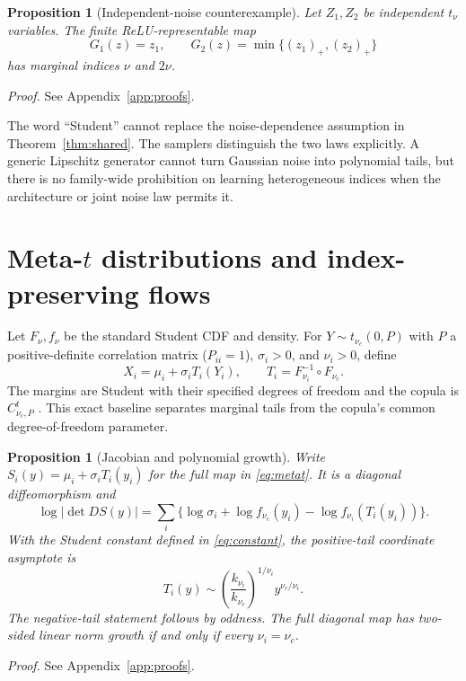 \documentclass[11pt]{article}
\newtheorem{proposition}[theorem]{Proposition}
\theoremstyle{definition}\newtheorem{definition}[theorem]{Definition}
\theoremstyle{remark}\newtheorem{remark}[theorem]{Remark}
\begin{document}
\begin{proposition}[Independent-noise counterexample]\label{prop:independent}
Let $Z_1,Z_2$ be independent $t_\nu$ variables. The finite ReLU-representable map
\begin{equation}
G_1(z)=z_1,\qquad G_2(z)=\min\{(z_1)_+,(z_2)_+\}
\end{equation}
has marginal indices $\nu$ and $2\nu$.
\end{proposition}
\noindent\emph{Proof.} See Appendix~\ref{app:proofs}.\par

The word ``Student'' cannot replace the noise-dependence assumption in Theorem~\ref{thm:shared}. The samplers distinguish the two laws explicitly. A generic Lipschitz generator cannot turn Gaussian noise into polynomial tails, but there is no family-wide prohibition on learning heterogeneous indices when the architecture or joint noise law permits it.

\section{Meta-\texorpdfstring{$t$}{t} distributions and index-preserving flows}\label{sec:metat}
Let $F_\nu,f_\nu$ be the standard Student CDF and density. For $Y\sim t_{\nu_c}(0,P)$ with $P$ a positive-definite correlation matrix ($P_{ii}=1$), $\sigma_i>0$, and $\nu_i>0$, define
\begin{equation}\label{eq:metat}
X_i=\mu_i+\sigma_iT_i(Y_i),\qquad T_i=F_{\nu_i}^{-1}\circ F_{\nu_c}.
\end{equation}
The margins are Student with their specified degrees of freedom and the copula is $C^t_{\nu_c,P}$ \citep{demarta2005tcopula}. This exact baseline separates marginal tails from the copula's common degree-of-freedom parameter.

\begin{proposition}[Jacobian and polynomial growth]\label{prop:meta}
Write $S_i(y)=\mu_i+\sigma_iT_i(y_i)$ for the full map in \eqref{eq:metat}. It is a diagonal diffeomorphism and
\begin{equation}\label{eq:meta-jac}
\log|\det DS(y)|=\sum_i\{\log\sigma_i+\log f_{\nu_c}(y_i)-\log f_{\nu_i}(T_i(y_i))\}.
\end{equation}
With the Student constant defined in \eqref{eq:constant}, the positive-tail coordinate asymptote is
\begin{equation}\label{eq:meta-asymptote}
T_i(y)\sim\left(\frac{k_{\nu_i}}{k_{\nu_c}}\right)^{1/\nu_i}y^{\nu_c/\nu_i}.
\end{equation}
The negative-tail statement follows by oddness. The full diagonal map has two-sided linear norm growth if and only if every $\nu_i=\nu_c$.
\end{proposition}
\noindent\emph{Proof.} See Appendix~\ref{app:proofs}.
\end{document}

